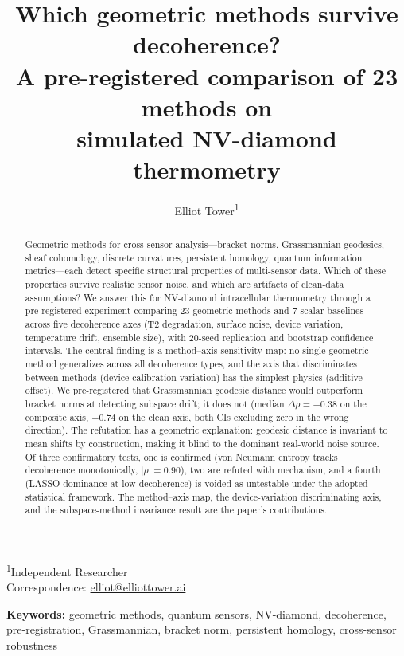 \documentclass[11pt]{article}
\title{Which geometric methods survive decoherence?\\
  A pre-registered comparison of 23 methods on\\
  simulated NV-diamond thermometry}
\author{Elliot Tower\textsuperscript{1}}
\date{}
\begin{document}
\maketitle

\noindent\textsuperscript{1}Independent Researcher\\
\noindent Correspondence: \href{mailto:elliot@elliottower.ai}{elliot@elliottower.ai}

\bigskip

\begin{abstract}
Geometric methods for cross-sensor analysis---bracket norms, Grassmannian
geodesics, sheaf cohomology, discrete curvatures, persistent homology,
quantum information metrics---each detect specific structural properties
of multi-sensor data.  Which of these properties survive realistic
sensor noise, and which are artifacts of clean-data assumptions?  We
answer this for NV-diamond intracellular thermometry through a
pre-registered experiment comparing 23 geometric methods and 7 scalar
baselines across five decoherence axes (T2 degradation, surface noise,
device variation, temperature drift, ensemble size), with 20-seed
replication and bootstrap confidence intervals.  The central finding is
a method--axis sensitivity map: no single geometric method generalizes
across all decoherence types, and the axis that discriminates between
methods (device calibration variation) has the simplest physics
(additive offset).  We pre-registered that Grassmannian geodesic
distance would outperform bracket norms at detecting subspace drift;
it does not (median $\Delta\rho = -0.38$ on the composite axis,
$-0.74$ on the clean axis, both CIs excluding zero in the wrong
direction).  The refutation has a geometric explanation: geodesic
distance is invariant to mean shifts by construction, making it blind
to the dominant real-world noise source.  Of three confirmatory
tests, one is confirmed (von Neumann entropy tracks decoherence
monotonically, $|\rho| = 0.90$), two are refuted with mechanism,
and a fourth (LASSO dominance at low decoherence) is voided as
untestable under the adopted statistical framework.
The method--axis map, the device-variation discriminating axis, and the
subspace-method invariance result are the paper's contributions.
\end{abstract}

\noindent\textbf{Keywords:}
geometric methods, quantum sensors, NV-diamond, decoherence,
pre-registration, Grassmannian, bracket norm, persistent homology,
cross-sensor robustness
\end{document}
